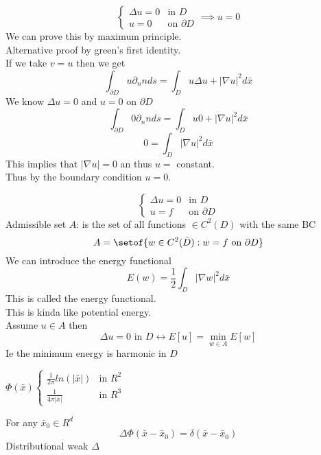 \documentclass[answers,12pt,addpoints]{exam}
\begin{document}
\begin{theorem}
    $$\begin{cases}
        \Delta u = 0 & \text{in } D\\
        u = 0 & \text{on } \partial D
    \end{cases} \implies u = 0$$
    We can prove this by maximum principle.\\
    Alternative proof by green's first identity.\\
    If we take $v = u$ then we get
    $$ \int_{\partial D} u \partial_n n ds = \int_D u \Delta u + |\nabla u|^2 d\bar{x}$$
    We know $\Delta u = 0$ and $u = 0$ on $\partial D$\\
    $$\int_{\partial D} 0 \partial_n n ds = \int_D u 0 + |\nabla u|^2 d\bar{x}$$ 
    $$ 0 = \int_D |\nabla u|^2 d\bar{x}$$
    This implies that $|\nabla u| = 0$ an thus $u = $ constant.\\
    Thus by the boundary condition $u = 0$.
\end{theorem}
\begin{theorem}
    $$\begin{cases}
        \Delta u = 0 & \text{in } D\\
        u = f & \text{on } \partial D
    \end{cases}$$
    Admissible set $A$: is the set of all functions $\in C^2(D)$ with the same BC \\
    $$A = \setof{w \in C^2(\bar{D}): w = f \text{ on } \partial D}$$
    We can introduce the energy functional
    $$E(w) = \frac{1}{2} \int_D |\nabla w|^2 d\bar{x}$$
    This is called the energy functional.\\
    This is kinda like potential energy.\\
    Assume $u \in A$ then \\
    $$ \Delta u = 0 \text{ in } D \leftrightarrow E[u] = \min_{w \in A} E[w]$$
    Ie the minimum energy is harmonic in $D$\\
\end{theorem}
\begin{theorem}
    $\Phi(\bar{x}) \begin{cases}
        \frac{1}{2\pi} ln(|\bar{x}|) & \text{in } R^2\\
        \frac{1}{4\pi |\bar{x}|} & \text{in } R^3
    \end{cases}$
\end{theorem}
\begin{lemma}
    For any $\bar{x}_0 \in R^d$
    $$ \Delta \Phi(\bar{x} - \bar{x}_0) = \delta(\bar{x} - \bar{x}_0)$$
    Distributional weak $\Delta$  
\end{lemma}
\end{document}
